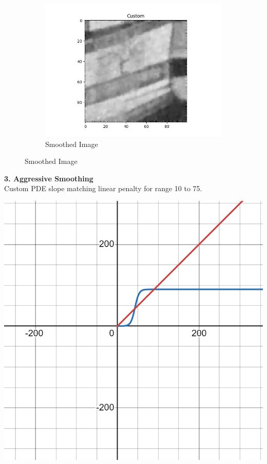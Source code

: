 \documentclass{article}
\begin{document}
\begin{center}
\begin{figure}[!htb]
\begin{center}
        \begin{subfigure}[b]{0.3\textwidth}
          \includegraphics[width=\textwidth]{../generated_images/Custom_test2.png}
          \caption{Smoothed Image}
        \end{subfigure}
      \end{center}
    \end{figure}
  \end{center}

  \newpage
  \noindent
  \textbf{3. Aggressive Smoothing}\\
  Custom PDE slope matching linear penalty for range 10 to 75.\\
  \begin{center}
    \includegraphics[scale=0.1]{../report_images/aggressive_smoothing.png}\\
  \end{center}
\end{document}

